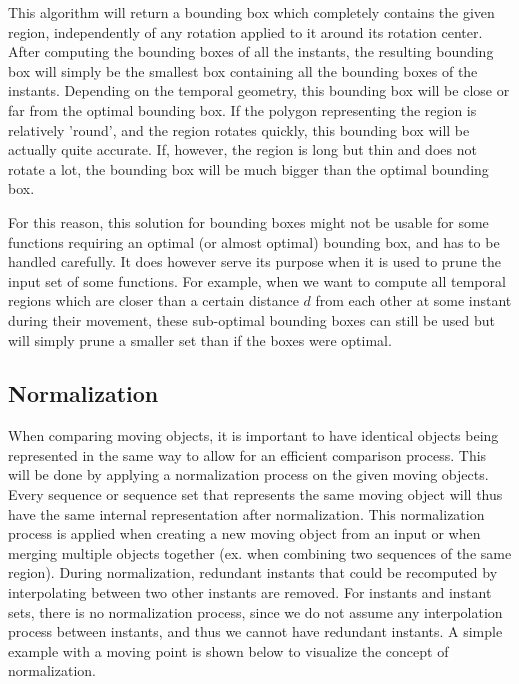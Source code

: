 This algorithm will return a bounding box which completely contains the given region, independently of any rotation applied to it around its rotation center. After computing the bounding boxes of all the instants, the resulting bounding box will simply be the smallest box containing all the bounding boxes of the instants. Depending on the temporal geometry, this bounding box will be close or far from the optimal bounding box. If the polygon representing the region is relatively 'round', and the region rotates quickly, this bounding box will be actually quite accurate. If, however, the region is long but thin and does not rotate a lot, the bounding box will be much bigger than the optimal bounding box.

For this reason, this solution for bounding boxes might not be usable for some functions requiring an optimal (or almost optimal) bounding box, and has to be handled carefully. It does however serve its purpose when it is used to prune the input set of some functions. For example, when we want to compute all temporal regions which are closer than a certain distance $d$ from each other at some instant during their movement, these sub-optimal bounding boxes can still be used but will simply prune a smaller set than if the boxes were optimal.

\subsection{Normalization}
\label{section:normalization}

When comparing moving objects, it is important to have identical objects being represented in the same way to allow for an efficient comparison process. This will be done by applying a normalization process on the given moving objects. Every sequence or sequence set that represents the same moving object will thus have the same internal representation after normalization. This normalization process is applied when creating a new moving object from an input or when merging multiple objects together (ex. when combining two sequences of the same region). During normalization, redundant instants that could be recomputed by interpolating between two other instants are removed. For instants and instant sets, there is no normalization process, since we do not assume any interpolation process between instants, and thus we cannot have redundant instants. A simple example with a moving point is shown below to visualize the concept of normalization.
    

